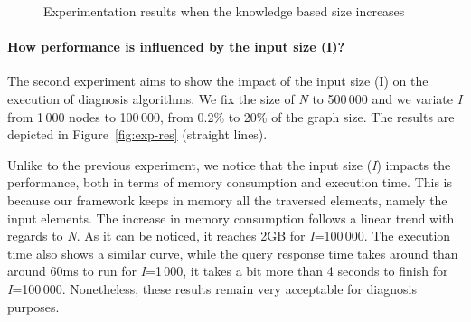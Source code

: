 \begin{figure}
	\centering
	\hfil
	\caption{Experimentation results when the knowledge based size increases}
	\label{fig:exp1}
\end{figure}

\paragraph{How performance is influenced by the input size (I)?}
The second experiment aims to show the impact of the input size (I) on the execution of diagnosis algorithms. We fix the size of \textit{N} to 500\,000 and we variate \textit{I} from 1\,000 nodes to 100\,000, \ie from 0.2\% to 20\% of the graph size. 
The results are depicted in Figure~\ref{fig:exp-res} (straight lines).

Unlike to the previous experiment, we notice that the input size (\textit{I}) impacts the performance, both in terms of memory consumption and execution time. This is because our framework keeps in memory all the traversed elements, namely the input elements.
The increase in memory consumption follows a linear trend with regards to \textit{N}. As it can be noticed, it reaches 2GB for \textit{I}=100\,000. The execution time also shows a similar curve, while the query response time takes around than around 60ms to run for \textit{I}=1\,000, it takes a bit more than 4 seconds to finish for \textit{I}=100\,000. Nonetheless, these results remain very acceptable for diagnosis purposes. 

